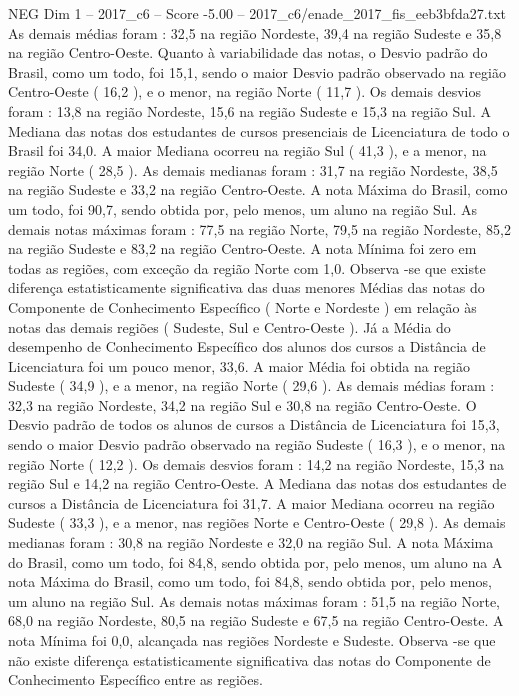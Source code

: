 \begin{textsample}{NEG Dim 1 – 2017\_c6 – Score -5.00 – 2017\_c6/enade\_2017\_fis\_eeb3bfda27.txt}
As demais médias foram : 32,5 na região Nordeste, 39,4 na região Sudeste e 35,8 na região Centro-Oeste.
Quanto à variabilidade das notas, o Desvio padrão do Brasil, como um todo, foi 15,1, sendo o maior Desvio padrão observado na região Centro-Oeste ( 16,2 ), e o menor, na região Norte ( 11,7 ).
Os demais desvios foram : 13,8 na região Nordeste, 15,6 na região Sudeste e 15,3 na região Sul.
A Mediana das notas dos estudantes de cursos presenciais de Licenciatura de todo o Brasil foi 34,0.
A maior Mediana ocorreu na região Sul ( 41,3 ), e a menor, na região Norte ( 28,5 ).
As demais medianas foram : 31,7 na região Nordeste, 38,5 na região Sudeste e 33,2 na região Centro-Oeste.
A nota Máxima do Brasil, como um todo, foi 90,7, sendo obtida por, pelo menos, um aluno na região Sul.
As demais notas máximas foram : 77,5 na região Norte, 79,5 na região Nordeste, 85,2 na região Sudeste e 83,2 na região Centro-Oeste.
A nota Mínima foi zero em todas as regiões, com exceção da região Norte com 1,0.
Observa -se que existe diferença estatisticamente significativa das duas menores Médias das notas do Componente de Conhecimento Específico ( Norte e Nordeste ) em relação às notas das demais regiões ( Sudeste, Sul e Centro-Oeste ).
Já a Média do desempenho de Conhecimento Específico dos alunos dos cursos a Distância de Licenciatura foi um pouco menor, 33,6.
A maior Média foi obtida na região Sudeste ( 34,9 ), e a menor, na região Norte ( 29,6 ).
As demais médias foram : 32,3 na região Nordeste, 34,2 na região Sul e 30,8 na região Centro-Oeste.
O Desvio padrão de todos os alunos de cursos a Distância de Licenciatura foi 15,3, sendo o maior Desvio padrão observado na região Sudeste ( 16,3 ), e o menor, na região Norte ( 12,2 ).
Os demais desvios foram : 14,2 na região Nordeste, 15,3 na região Sul e 14,2 na região Centro-Oeste.
A Mediana das notas dos estudantes de cursos a Distância de Licenciatura foi 31,7.
A maior Mediana ocorreu na região Sudeste ( 33,3 ), e a menor, nas regiões Norte e Centro-Oeste ( 29,8 ).
As demais medianas foram : 30,8 na região Nordeste e 32,0 na região Sul.
A nota Máxima do Brasil, como um todo, foi 84,8, sendo obtida por, pelo menos, um aluno na A nota Máxima do Brasil, como um todo, foi 84,8, sendo obtida por, pelo menos, um aluno na região Sul.
As demais notas máximas foram : 51,5 na região Norte, 68,0 na região Nordeste, 80,5 na região Sudeste e 67,5 na região Centro-Oeste.
A nota Mínima foi 0,0, alcançada nas regiões Nordeste e Sudeste.
Observa -se que não existe diferença estatisticamente significativa das notas do Componente de Conhecimento Específico entre as regiões.

\end{textsample}
